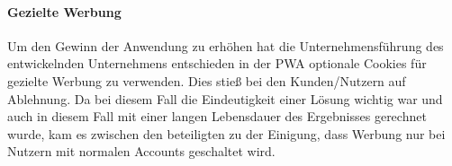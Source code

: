 \paragraph{Gezielte Werbung}
Um den Gewinn der Anwendung zu erhöhen hat die Unternehmensführung des entwickelnden Unternehmens entschieden in der PWA
optionale Cookies für gezielte Werbung zu verwenden.
Dies stieß bei den Kunden/Nutzern auf Ablehnung.
Da bei diesem Fall die Eindeutigkeit einer Lösung wichtig war und auch in diesem Fall mit einer langen Lebensdauer des
Ergebnisses gerechnet wurde, kam es zwischen den beteiligten zu der Einigung, dass Werbung nur bei Nutzern mit normalen
Accounts geschaltet wird.
